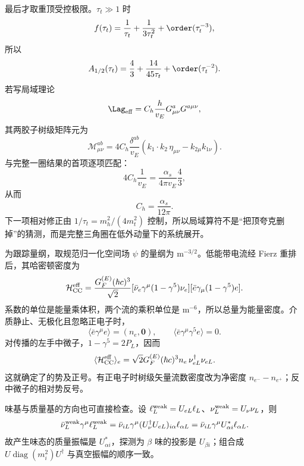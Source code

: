 \begin{derivation}
最后才取重顶受控极限。$\tau_t\gg1$ 时
\begin{equation*}
f(\tau_t)=\frac1{\tau_t}+\frac1{3\tau_t^2}+\order(\tau_t^{-3}),
\end{equation*}
所以
\begin{equation*}
A_{1/2}(\tau_t)=\frac43+\frac{14}{45\tau_t}+\order(\tau_t^{-2}).
\end{equation*}
若写局域理论
\begin{equation*}
\Lag_{\rm eff}=C_h\frac{h}{v_E}G^a_{\mu\nu}G^{a\mu\nu},
\end{equation*}
其两胶子树级矩阵元为
\begin{equation*}
\mathcal M_{\mu\nu}^{ab}
=4C_h\frac{\delta^{ab}}{v_E}
\left(k_1\!\cdot k_2\,\eta_{\mu\nu}-k_{2\mu}k_{1\nu}\right).
\end{equation*}
与完整一圈结果的首项逐项匹配：
\begin{equation*}
4C_h\frac1{v_E}
=\frac{\alpha_s}{4\pi v_E}\frac43,
\end{equation*}
从而
\begin{equation*}
{C_h=\frac{\alpha_s}{12\pi}.}
\end{equation*}
下一项相对修正由 $1/\tau_t=m_h^2/(4m_t^2)$ 控制，所以局域算符不是“把顶夸克删掉”的猜测，而是完整三角圈在低外动量下的系统展开。
\end{derivation}

\begin{derivation}[从带电流平均场到物质势]
为跟踪量纲，取规范归一化空间场 $\psi$ 的量纲为 $\mathrm{m^{-3/2}}$。低能带电流经 Fierz 重排后，其哈密顿密度为
\begin{equation*}
 \mathcal H_{\rm CC}^{\rm eff}
 =\frac{G_F^{(E)}(\hbar c)^3}{\sqrt2}
 [\bar\nu_e\gamma^\mu(1-\gamma^5)\nu_e]
 [\bar e\gamma_\mu(1-\gamma^5)e].
\end{equation*}
系数的单位是能量乘体积，两个流的乘积单位是 $\mathrm{m^{-6}}$，所以总量为能量密度。介质静止、无极化且忽略正电子时，
\begin{equation*}
 \langle\bar e\gamma^\mu e\rangle=(n_e,\boldsymbol0),\qquad
 \langle\bar e\gamma^\mu\gamma^5e\rangle=0.
\end{equation*}
对传播的左手中微子，$1-\gamma^5=2P_L$，因而
\begin{equation*}
 \langle\mathcal H_{\rm CC}^{\rm eff}\rangle_e
 =\sqrt2G_F^{(E)}(\hbar c)^3n_e\,\nu_{eL}^\dagger\nu_{eL}.
\end{equation*}
这就确定了的势及正号。有正电子时树级矢量流数密度改为净密度 $n_{e^-}-n_{e^+}$；反中微子的相对势反号。

味基与质量基的方向也可直接检查。设 $\ell_L^{\rm weak}=U_{eL}\ell_L$、$\nu_L^{\rm weak}=U_\nu\nu_L$，则
\begin{equation*}
 \bar\nu_L^{\rm weak}\gamma^\mu\ell_L^{\rm weak}
 =\bar\nu_{iL}\gamma^\mu(U_\nu^\dagger U_{eL})_{i\alpha}\ell_{\alpha L}
 =\bar\nu_{iL}\gamma^\mu U_{\alpha i}^*\ell_{\alpha L}.
\end{equation*}
故产生味态的质量振幅是 $U_{\alpha i}^*$，探测为 $\beta$ 味的投影是 $U_{\beta i}$；组合成 $U\operatorname{diag}(m_i^2)U^\dagger$ 与真空振幅的顺序一致。
\end{derivation}

